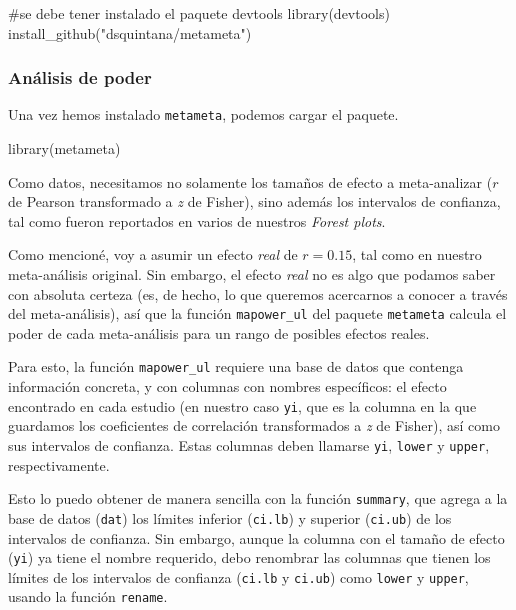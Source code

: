 \documentclass[
  bookmarksnumbered]{article}
\newenvironment{Shaded}{\begin{snugshade}}{\end{snugshade}}
\newcommand{\CommentTok}[1]{\textcolor[rgb]{0.54,0.53,0.53}{#1}}
\newcommand{\FunctionTok}[1]{\textcolor[rgb]{0.39,0.29,0.61}{#1}}
\newcommand{\NormalTok}[1]{\textcolor[rgb]{0.12,0.11,0.11}{#1}}
\newcommand{\StringTok}[1]{\textcolor[rgb]{0.75,0.01,0.01}{#1}}
\begin{document}
\begin{Shaded}
\begin{Highlighting}[]
\CommentTok{\#se debe tener instalado el paquete devtools}
\FunctionTok{library}\NormalTok{(devtools)}
\FunctionTok{install\_github}\NormalTok{(}\StringTok{"dsquintana/metameta"}\NormalTok{)}
\end{Highlighting}
\end{Shaded}

\hypertarget{anuxe1lisis-de-poder}{%
\subsubsection{Análisis de poder}\label{anuxe1lisis-de-poder}}

Una vez hemos instalado \texttt{metameta}, podemos cargar el paquete.

\begin{Shaded}
\begin{Highlighting}[]
\FunctionTok{library}\NormalTok{(metameta)}
\end{Highlighting}
\end{Shaded}

Como datos, necesitamos no solamente los tamaños de efecto a meta-analizar (\(r\) de Pearson transformado a \emph{z} de Fisher), sino además los intervalos de confianza, tal como fueron reportados en varios de nuestros \emph{Forest plots}.

Como mencioné, voy a asumir un efecto \emph{real} de \(r = 0.15\), tal como en nuestro meta-análisis original. Sin embargo, el efecto \emph{real} no es algo que podamos saber con absoluta certeza (es, de hecho, lo que queremos acercarnos a conocer a través del meta-análisis), así que la función \texttt{mapower\_ul} del paquete \texttt{metameta} calcula el poder de cada meta-análisis para un rango de posibles efectos reales.

Para esto, la función \texttt{mapower\_ul} requiere una base de datos que contenga información concreta, y con columnas con nombres específicos: el efecto encontrado en cada estudio (en nuestro caso \texttt{yi}, que es la columna en la que guardamos los coeficientes de correlación transformados a \emph{z} de Fisher), así como sus intervalos de confianza. Estas columnas deben llamarse \texttt{yi}, \texttt{lower} y \texttt{upper}, respectivamente.

Esto lo puedo obtener de manera sencilla con la función \texttt{summary}, que agrega a la base de datos (\texttt{dat}) los límites inferior (\texttt{ci.lb}) y superior (\texttt{ci.ub}) de los intervalos de confianza. Sin embargo, aunque la columna con el tamaño de efecto (\texttt{yi}) ya tiene el nombre requerido, debo renombrar las columnas que tienen los límites de los intervalos de confianza (\texttt{ci.lb} y \texttt{ci.ub}) como \texttt{lower} y \texttt{upper}, usando la función \texttt{rename}.
\end{document}
